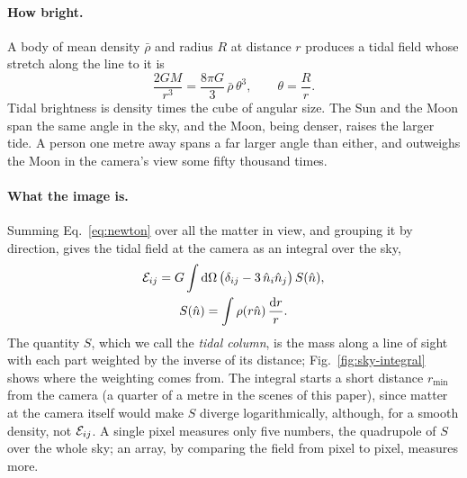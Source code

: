 \paragraph{How bright.} A body of mean density $\bar\rho$ and radius $R$ at
distance $r$ produces a tidal field whose stretch along the line to it is
\begin{equation}\label{eq:tidal-brightness}
\frac{2GM}{r^{3}} = \frac{8\pi G}{3}\,\bar\rho\,\theta^{3},
\qquad \theta = \frac{R}{r} .
\end{equation}
Tidal brightness is density times the cube of angular size. The Sun and the
Moon span the same angle in the sky, and the Moon, being denser, raises the
larger tide. A person one metre away spans a far larger angle than either,
and outweighs the Moon in the camera's view some fifty thousand times.

\paragraph{What the image is.} Summing Eq.~\eqref{eq:newton} over all the matter
in view, and grouping it by direction, gives the tidal field at the camera as
an integral over the sky,
\begin{equation}\label{eq:tidal-column}
\begin{gathered}
\mathcal{E}_{ij} = G \int \mathrm{d}\Omega\,\bigl(\delta_{ij} - 3\,\hat n_i \hat n_j\bigr)\,S(\hat n),\\
S(\hat n) = \int \rho(r\hat n)\,\frac{\mathrm{d} r}{r} .
\end{gathered}
\end{equation}
The quantity $S$, which we call the \emph{tidal column}, is the mass along a
line of sight with each part weighted by the inverse of its distance;
Fig.~\ref{fig:sky-integral} shows where the weighting comes from. The
integral starts a short distance $r_{\min}$ from the camera (a quarter of a
metre in the scenes of this paper), since matter at the camera itself would make $S$
diverge logarithmically, although, for a smooth density, not $\mathcal{E}_{ij}$. A single pixel measures only
five numbers, the quadrupole of $S$ over the whole sky; an array, by comparing
the field from pixel to pixel, measures more.

